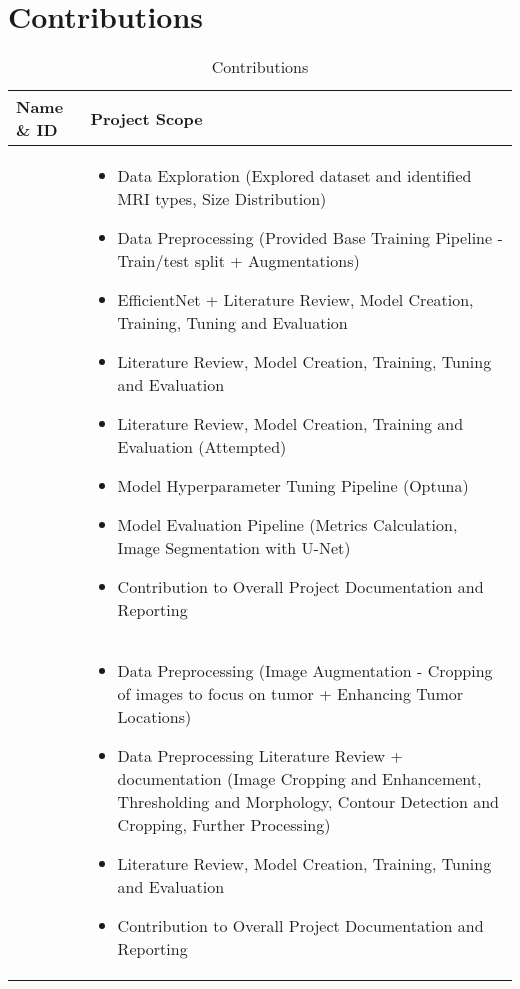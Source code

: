 \section{Contributions}\label{contribution}


\begin{longtable}{p{5cm}|p{9.5cm}}
  \caption{Contributions}
  \label{tab:contributions}
    \hline
    \textbf{Name} \& \textbf{ID} & \textbf{Project Scope}\\
    \hline

    \nameref{ss:wjw} &
        \begin{itemize}
            \item Data Exploration (Explored dataset and identified MRI types, Size Distribution)
            \item Data Preprocessing (Provided Base Training Pipeline - Train/test split + Augmentations)
            \item EfficientNet + \nameref{s:unet} Literature Review, Model Creation, Training, Tuning and Evaluation
            \item \nameref{s:inceptionv3} Literature Review, Model Creation, Training, Tuning and Evaluation
            \item \nameref{ss:vgg16} Literature Review, Model Creation, Training and Evaluation (Attempted)
            \item Model Hyperparameter Tuning Pipeline (Optuna)
            \item Model Evaluation Pipeline (Metrics Calculation, Image Segmentation with U-Net)
            \item Contribution to Overall Project Documentation and Reporting
        \end{itemize}\\
        \hline

    \nameref{ss:blch} &
        \begin{itemize}
            \item Data Preprocessing (Image Augmentation - Cropping of images to focus on tumor + Enhancing Tumor Locations)
            \item Data Preprocessing Literature Review + documentation (Image Cropping and Enhancement, Thresholding and Morphology, Contour Detection and Cropping, Further Processing)
            \item \nameref{s:resnet50} Literature Review, Model Creation, Training, Tuning and Evaluation
            \item Contribution to Overall Project Documentation and Reporting
        \end{itemize}\\
        \hline


\end{longtable}
